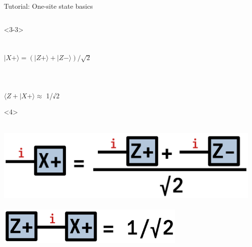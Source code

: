 \begin{frame}[fragile]{Tutorial: One-site state basics}
\begin{columns}
\begin{column}[T]{0.6\textwidth}
\begin{onlyenv}<3-3>
~\\
~\\
~\\
$|X+\rangle = (|Z+\rangle + |Z-\rangle)/\sqrt{2}$ \\
~\\
~\\
~\\
$\langle Z+|X+\rangle\approx$ 1/√2 \\
\end{onlyenv}

\begin{onlyenv}<4>
~\\
~\\
\vspace*{-0.1cm}
\begin{center}
\includegraphics[width=1.0\textwidth]{
  slides/assets/Zp+Zm.png
} \\
~\\
\includegraphics[width=0.7\textwidth]{
  slides/assets/ZpXp.png
}
\end{center}
\end{onlyenv}
\end{column}

\end{columns}

\end{frame}
